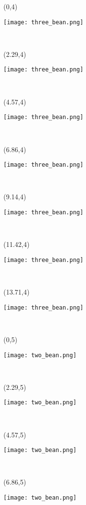 \documentclass[a4paper]{article}
\newcommand{\myXthreeBean}[0]{
\texttt{[image: three\_bean.png]}
}
\newcommand{\myXtwoBean}[0]{
\texttt{[image: two\_bean.png]}
}
\newcommand{\mycard}[5]{%
	\tiny #1 #2
	\hspace{-0.75cm} \large#3\\
}
\begin{document}

\begin{textblock}{2.29}(0,4)
\mycard{}{}{
\myXthreeBean
}{}{} 
\end{textblock}

\begin{textblock}{2.29}(2.29,4)
\mycard{}{}{
\myXthreeBean
}{}{} 
\end{textblock}

\begin{textblock}{2.29}(4.57,4)
\mycard{}{}{
\myXthreeBean
}{}{} 
\end{textblock}

\begin{textblock}{2.29}(6.86,4)
\mycard{}{}{
\myXthreeBean
}{}{} 
\end{textblock}

\begin{textblock}{2.29}(9.14,4)
\mycard{}{}{
\myXthreeBean
}{}{} 
\end{textblock}

\begin{textblock}{2.29}(11.42,4)
\mycard{}{}{
\myXthreeBean
}{}{} 
\end{textblock}

\begin{textblock}{2.29}(13.71,4)
\mycard{}{}{
\myXthreeBean
}{}{} 
\end{textblock}


\begin{textblock}{2.29}(0,5)
\mycard{}{}{
\myXtwoBean
}{}{} 
\end{textblock}

\begin{textblock}{2.29}(2.29,5)
\mycard{}{}{
\myXtwoBean
}{}{} 
\end{textblock}

\begin{textblock}{2.29}(4.57,5)
\mycard{}{}{
\myXtwoBean
}{}{} 
\end{textblock}

\begin{textblock}{2.29}(6.86,5)
\mycard{}{}{
\myXtwoBean
}{}{} 
\end{textblock}
\end{document}
